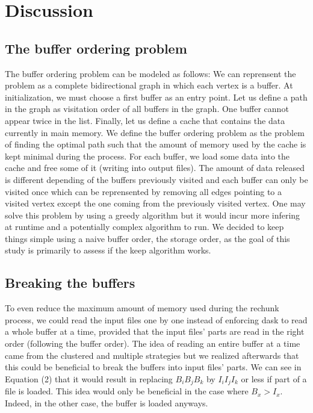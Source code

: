 \documentclass[conference]{IEEEtran}
\begin{document}
\section{Discussion}

\subsection{The buffer ordering problem}
The buffer ordering problem can be modeled as follows: We can reprensent the
problem as a complete bidirectional graph in which each vertex is a buffer. At
initialization, we must choose a first buffer as an entry point. Let us define
a path in the graph as visitation order of all buffers in the graph. One buffer
cannot appear twice in the list. Finally, let us define a cache that contains
the data currently in main memory. We define the buffer ordering problem as the
problem of finding the optimal path such that the amount of memory used by the
cache is kept minimal during the process. For each buffer, we load some data
into the cache and free some of it (writing into output files). The amount of
data released is different depending of the buffers previously visited and each
buffer can only be visited once which can be reprensented by removing all edges
pointing to a visited vertex except the one coming from the previously visited
vertex. One may solve this problem by using a greedy algorithm but it would
incur more infering at runtime and a potentially complex algorithm to run.
We decided to keep things simple using a naive buffer order, the storage order,
as the goal of this study is primarily to assess if the keep algorithm works.

\subsection{Breaking the buffers}
To even reduce the maximum amount of memory used during the rechunk process, we
could read the input files one by one instead of enforcing dask to read a whole
buffer at a time, provided that the input files' parts are read in the right
order (following the buffer order). The idea of reading an entire buffer at a
time came from the clustered and multiple strategies but we realized afterwards
that this could be beneficial to break the buffers into input files' parts. We
can see in Equation (2) that it would result in replacing $B_iB_jB_k$ by
$I_iI_jI_k$ or less if part of a file is loaded. This idea would only be
beneficial in the case where $B_x>I_x$. Indeed, in the other case, the buffer is
loaded anyways.
\end{document}

